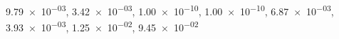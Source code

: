 \num{9.79e-03}, \num{3.42e-03}, \num{1.00e-10}, \num{1.00e-10}, \num{6.87e-03}, \num{3.93e-03}, \num{1.25e-02}, \num{9.45e-02}